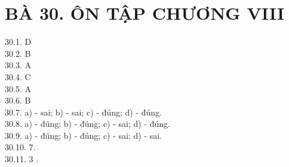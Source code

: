 \documentclass[10pt]{article}
\begin{document}
\section*{BÀ 30. ÔN TẬP CHƯƠNG VIII}
30.1. D\\
30.2. B\\
30.3. A\\
30.4. C\\
30.5. A\\
30.6. B\\
30.7. a) - sai; b) - sai; c) - đúng; d) - đúng.\\
30.8. a) - đúng; b) - đúng; c) - sai; d) - đúng.\\
30.9. a) - đúng; b) - đúng; c) - sai; d) - sai.\\
30.10. 7.\\
30.11. 3 .
\end{document}
